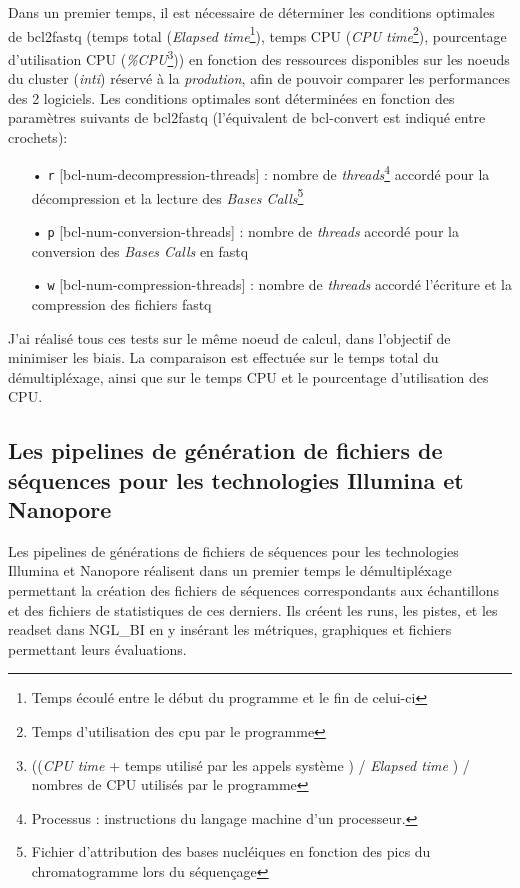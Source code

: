 Dans un premier temps, il est nécessaire de déterminer les conditions optimales de bcl2fastq (temps total (\emph{Elapsed time}\footnote{Temps écoulé entre le début du programme et le fin de celui-ci}), temps CPU (\emph{CPU time}\footnote{Temps d'utilisation des cpu par le programme}), pourcentage d'utilisation CPU (\emph{\%CPU}\footnote{((\emph{CPU time} + temps utilisé par les appels système ) / \emph{Elapsed time} ) / nombres de CPU utilisés par le programme})) en fonction des ressources disponibles sur les noeuds du cluster (\emph{inti}) réservé à la \emph{prodution}, afin de pouvoir comparer les performances des 2 logiciels. Les conditions optimales sont déterminées en fonction des paramètres suivants de bcl2fastq (l'équivalent de bcl-convert est indiqué entre crochets): \\
\begin{itemize}
    \item[•] \texttt{r} [bcl-num-decompression-threads] : nombre de \emph{threads}\footnote{Processus : instructions du langage machine d'un processeur.} accordé pour la décompression et la lecture des \emph{Bases Calls}\footnote{Fichier d'attribution des bases nucléiques en fonction des pics du chromatogramme lors du séquençage}
    \item[•] \texttt{p} [bcl-num-conversion-threads] : nombre de \emph{threads} accordé pour la conversion des \emph{Bases Calls} en fastq
    \item[•] \texttt{w} [bcl-num-compression-threads] : nombre de \emph{threads} accordé l'écriture et la compression des fichiers fastq\\
\end{itemize}

J'ai réalisé tous ces tests sur le même noeud de calcul, dans l'objectif de minimiser les biais. La comparaison est effectuée sur le temps total du démultipléxage, ainsi que sur le temps CPU et le pourcentage d'utilisation des CPU.

\subsection{Les pipelines de génération de fichiers de séquences pour les technologies Illumina et Nanopore}
Les pipelines de générations de fichiers de séquences pour les technologies Illumina et Nanopore réalisent dans un premier temps le démultipléxage permettant la création des fichiers de séquences correspondants aux échantillons et des fichiers de statistiques de ces derniers. Ils créent les runs, les pistes, et les readset dans NGL\_BI en y insérant les métriques, graphiques et fichiers permettant leurs évaluations.\\

